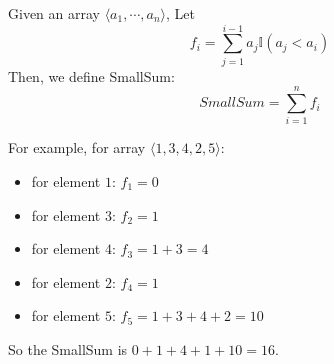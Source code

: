 Given an array \(\langle a_1,\cdots,a_n\rangle\), Let
$$
    f_i=\sum_{j=1}^{i-1} a_j\mathbb{I}(a_j<a_i)
$$
Then, we define SmallSum:
$$
    SmallSum = \sum_{i = 1}^{n} f_i
$$

For example, for array \(\langle1,3,4,2,5\rangle\):
\begin{itemize}
    \item for element $1$: $f_1=0$
    \item for element $3$: $f_2=1$
    \item for element $4$: $f_3=1+3=4$
    \item for element $2$: $f_4=1$
    \item for element $5$: $f_5=1+3+4+2=10$
\end{itemize}
So the SmallSum is $0+1+4+1+10=16$.

